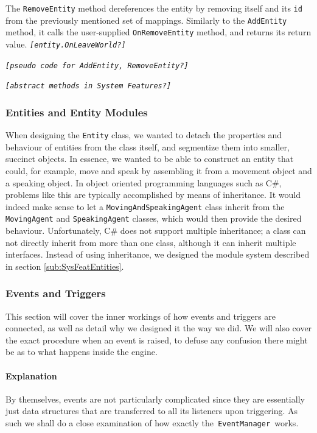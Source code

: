 The \texttt{RemoveEntity} method dereferences the entity by removing
itself and its \texttt{id} from the previously mentioned set of mappings.
Similarly to the \texttt{AddEntity} method, it calls the user-supplied
\texttt{OnRemoveEntity} method, and returns its return value. \texttt{\emph{{[}entity.OnLeaveWorld?{]}}}

\texttt{\emph{{[}pseudo code for AddEntity, RemoveEntity?{]}}}

\texttt{\emph{{[}abstract methods in System Features?{]}}}


\subsubsection{Entities and Entity Modules}

When designing the \texttt{Entity} class, we wanted to detach the
properties and behaviour of entities from the class itself, and segmentize
them into smaller, succinct objects. In essence, we wanted to be able
to construct an entity that could, for example, move and speak by
assembling it from a movement object and a speaking object. In object
oriented programming languages such as C\#, problems like this are
typically accomplished by means of inheritance. It would indeed make
sense to let a \texttt{MovingAndSpeakingAgent} class inherit from
the \texttt{MovingAgent} and \texttt{SpeakingAgent} classes, which
would then provide the desired behaviour. Unfortunately, C\# does
not support multiple inheritance; a class can not directly inherit
from more than one class, although it can inherit multiple interfaces.
Instead of using inheritance, we designed the module system described
in section \ref{sub:SysFeatEntities}.


\subsubsection{Events and Triggers}

This section will cover the inner workings of how events and triggers
are connected, as well as detail why we designed it the way we did.
We will also cover the exact procedure when an event is raised, to
defuse any confusion there might be as to what happens inside the
engine.


\paragraph*{Explanation}

By themselves, events are not particularly complicated since they
are essentially just data structures that are transferred to all its
listeners upon triggering. As such we shall do a close examination
of how exactly the\texttt{ EventManager }works.

